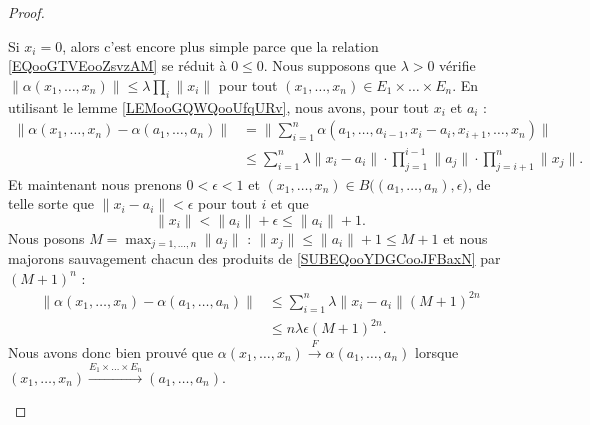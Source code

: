 \begin{proof}
\begin{subproof}
		Si \( x_i=0\), alors c'est encore plus simple parce que la relation \eqref{EQooGTVEooZsvzAM} se réduit à \( 0\leq 0\).
		\spitem[\( \Leftarrow\)]
		Nous supposons que \( \lambda>0\) vérifie \( \| \alpha(x_1,\ldots,x_n) \|\leq \lambda \prod_i\| x_i \|\) pour tout \( (x_1,\ldots,x_n)\in E_1\times \ldots\times E_n\). En utilisant le lemme \ref{LEMooGQWQooUfqURv}, nous avons, pour tout \( x_i\) et \( a_i\) :
		\begin{subequations}
			\begin{align}
				\| \alpha(x_1,\ldots,x_n)-\alpha(a_1,\ldots,a_n) \| & =\| \sum_{i=1}^n\alpha(a_1,\ldots,a_{i-1},x_i-a_i,x_{i+1},\ldots,x_n) \|                                                             \\
				                                                    & \leq \sum_{i=1}^n  \lambda  \| x_i-a_i \|\cdot \prod_{j=1}^{i-1}\| a_j \|\cdot\prod_{j=i+1}^n\| x_j \|.		\label{SUBEQooYDGCooJFBaxN}
			\end{align}
		\end{subequations}
		Et maintenant nous prenons \( 0<\epsilon<1\) et \( (x_1,\ldots,x_n)\in B\big( (a_1,\ldots,a_n),\epsilon \big)\), de telle sorte que \( \| x_i-a_i \|<\epsilon\) pour tout \( i\) et que
		\begin{equation}
			\| x_i \|<\| a_i \|+\epsilon\leq \| a_i \|+1.
		\end{equation}
		Nous posons \( M=\max_{j=1,\ldots,n}\| a_j \|\) : \( \| x_j \|\leq \| a_i \|+1\leq M+1\) et nous majorons sauvagement chacun des produits de \eqref{SUBEQooYDGCooJFBaxN} par \( (M+1)^n\) :
		\begin{subequations}
			\begin{align}
				\| \alpha(x_1,\ldots,x_n)-\alpha(a_1,\ldots,a_n) \| & \leq \sum_{i=1}^n\lambda \| x_i-a_i \|(M+1)^{2n} \\
				                                                    & \leq n\lambda \epsilon (M+1)^{2n}.
			\end{align}
		\end{subequations}
		Nous avons donc bien prouvé que \( \alpha(x_1,\ldots,x_n)\stackrel{F}{\longrightarrow} \alpha(a_1,\ldots,a_n) \) lorsque \( (x_1,\ldots,x_n)\stackrel{ E_1\times \ldots\times E_n}{\longrightarrow} (a_1,\ldots,a_n) \).

	\end{subproof}
\end{proof}



